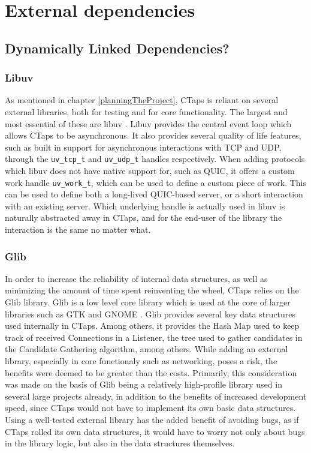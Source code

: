 \section{External dependencies}
\subsection{Dynamically Linked Dependencies?} 
\subsubsection{Libuv}
As mentioned in chapter \ref{planningTheProject}, CTaps is reliant on several
external libraries, both for testing and for core functionality. The largest
and most essential of these are libuv \cite{Libuv2025}. Libuv provides the central
event loop which allows CTaps to be asynchronous. It also provides several quality
of life features, such as built in support for asynchronous interactions with TCP
and UDP, through the \texttt{uv\_tcp\_t} and \texttt{uv\_udp\_t} handles respectively.
When adding protocols which libuv does not have native support for, such as QUIC,
it offers a custom work handle \texttt{uv\_work\_t}, which can be used to define
a custom piece of work. This can be used to define both a long-lived QUIC-based
server, or a short interaction with an existing server. Which underlying handle
is actually used in libuv is naturally abstracted away in CTaps, and for the
end-user of the library the interaction is the same no matter what. 

\subsubsection{Glib}
In order to increase the reliability of internal data structures, as well as
minimizing the amount of time spent reinventing the wheel, CTaps relies on the
Glib library. Glib is a low level core library which is used at the core of
larger libraries such as GTK and GNOME . Glib provides several
key data structures used internally in CTaps. Among others, it provides the
Hash Map used to keep track of received Connections in a Listener, the tree
used to gather candidates in the Candidate Gathering algorithm, among others.
While adding an external library, especially in core functionaly such as networking,
poses a risk, the benefits were deemed to be greater than the costs. Primarily,
this consideration was made on the basis of Glib being a relatively high-profile
library used in several large projects already, in addition to the benefits of
increased development speed, since CTaps would not have to implement its own 
basic data structures. Using a well-tested external library has the added benefit
of avoiding bugs, as if CTaps rolled its own data structures, it would have
to worry not only about bugs in the library logic, but also in the
data structures themselves.

